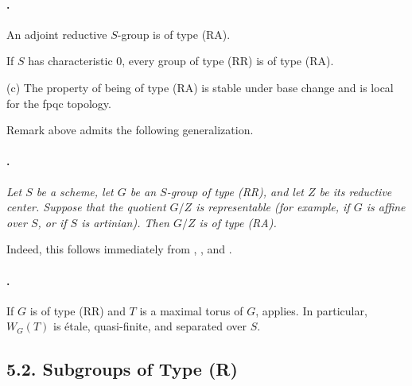 \paragraph{.}
\textup{} An adjoint reductive \(S\)-group is of type
\textup{(RA)}.

\textup{} If \(S\) has characteristic \(0\), every group of
type \textup{(RR)} is of type \textup{(RA)}.

\textup{(c)} The property of being of type \textup{(RA)} is stable
under base change and is local for the fpqc topology.

Remark \textup{} above admits the following generalization.

\paragraph{.}
\textit{Let \(S\) be a scheme, let \(G\) be an \(S\)-group of type
\textup{(RR)}, and let \(Z\) be its reductive center. Suppose that
the quotient \(G/Z\) is representable \textup{(for example, if
\(G\) is affine over \(S\), or if \(S\) is artinian)}. Then \(G/Z\)
is of type \textup{(RA)}.}

Indeed, this follows immediately from , , and 
\textup{}.

\paragraph{.}
If \(G\) is of type \textup{(RR)} and \(T\) is a maximal torus of
\(G\),  applies. In particular,
\(W_G(T)\) is étale, quasi-finite, and separated over \(S\).

\subsection*{5.2. Subgroups of Type \textup{(R)}}


